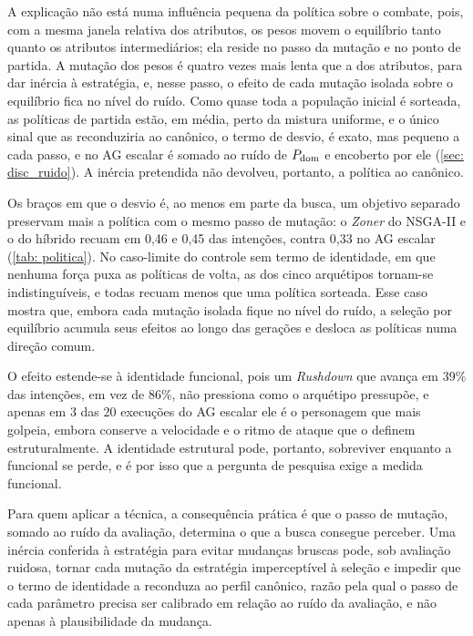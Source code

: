 A explicação não está numa influência pequena da política sobre o combate, pois, com a mesma janela relativa dos atributos, os pesos movem o equilíbrio tanto quanto os atributos intermediários; ela reside no passo da mutação e no ponto de partida. A mutação dos pesos é quatro vezes mais lenta que a dos atributos, para dar inércia à estratégia, e, nesse passo, o efeito de cada mutação isolada sobre o equilíbrio fica no nível do ruído. Como quase toda a população inicial é sorteada, as políticas de partida estão, em média, perto da mistura uniforme, e o único sinal que as reconduziria ao canônico, o termo de desvio, é exato, mas pequeno a cada passo, e no AG escalar é somado ao ruído de $P_{\mathrm{dom}}$ e encoberto por ele (\autoref{sec: disc_ruido}). A inércia pretendida não devolveu, portanto, a política ao canônico.

Os braços em que o desvio é, ao menos em parte da busca, um objetivo separado preservam mais a política com o mesmo passo de mutação: o \textit{Zoner} do NSGA-II e o do híbrido recuam em 0,46 e 0,45 das intenções, contra 0,33 no AG escalar (\autoref{tab: politica}). No caso-limite do controle sem termo de identidade, em que nenhuma força puxa as políticas de volta, as dos cinco arquétipos tornam-se indistinguíveis, e todas recuam menos que uma política sorteada. Esse caso mostra que, embora cada mutação isolada fique no nível do ruído, a seleção por equilíbrio acumula seus efeitos ao longo das gerações e desloca as políticas numa direção comum.

O efeito estende-se à identidade funcional, pois um \textit{Rushdown} que avança em 39\% das intenções, em vez de 86\%, não pressiona como o arquétipo pressupõe, e apenas em 3 das 20 execuções do AG escalar ele é o personagem que mais golpeia, embora conserve a velocidade e o ritmo de ataque que o definem estruturalmente. A identidade estrutural pode, portanto, sobreviver enquanto a funcional se perde, e é por isso que a pergunta de pesquisa exige a medida funcional.

Para quem aplicar a técnica, a consequência prática é que o passo de mutação, somado ao ruído da avaliação, determina o que a busca consegue perceber. Uma inércia conferida à estratégia para evitar mudanças bruscas pode, sob avaliação ruidosa, tornar cada mutação da estratégia imperceptível à seleção e impedir que o termo de identidade a reconduza ao perfil canônico, razão pela qual o passo de cada parâmetro precisa ser calibrado em relação ao ruído da avaliação, e não apenas à plausibilidade da mudança.


